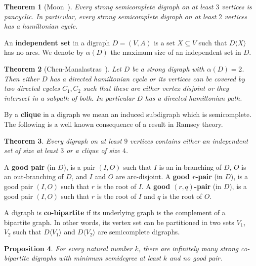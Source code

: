 \documentclass{article}
\newtheorem{theorem}{Theorem}
\newtheorem{proposition}[theorem]{Proposition}
\theoremstyle{definition}
\newcommand{\AY}[1]{{#1}}
\newcommand{\induce}[2]{#1\langle #2 \rangle}
\newcommand{\2}{\vspace{0.2cm}}
\begin{document}
\begin{theorem}[Moon~\cite{moonCMB9}]
\label{thm:pancyclic}
Every strong semicomplete digraph \AY{on at least $3$ vertices} is pancyclic. 
In particular, every strong semicomplete digraph \AY{on at least $2$ vertices} has a hamiltonian cycle.
\end{theorem}

An {\bf independent set} in a digraph $D=(V,A)$ is a set $X\subseteq
V$ such that $\induce{D}{X}$ has no arcs. We denote by $\alpha{}(D)$
the maximum size of an independent set in $D$.

\begin{theorem}[Chen-Manalastras~\cite{chenDM44}]
\label{thm:CMthm}
Let $D$ be a strong digraph with $\alpha{}(D)=2$. Then either $D$ has
a directed hamiltonian cycle or its vertices can be covered by two
directed cycles $C_1,C_2$ such that these are either vertex disjoint
or they intersect in a subpath of both. In particular $D$ has a
directed hamiltonian path.
\end{theorem}


By a {\bf clique} in a digraph we mean an induced subdigraph which is
semicomplete. The following is a well known consequence of a result in
Ramsey theory.

\begin{theorem}\label{thm:Ramsey}
Every digraph on at least $9$ vertices contains either an independent
set of size at least $3$ or a clique of size $4$.
\end{theorem}



A {\bf good pair} (in $D$), is a pair $(I,O)$ such that $I$ is an
in-branching of $D$, $O$ is an out-branching of $D$, and $I$ and $O$
are arc-disjoint.  A {\bf good $r$-pair} (in $D$), is a good pair
$(I,O)$ such that $r$ is the root of $I$.  A {\bf good $(r,q)$-pair}
(in $D$), is a good pair $(I,O)$ such that $r$ is the root of $I$ and
$q$ is the root of $O$.


A digraph is {\bf co-bipartite} if its underlying graph is the
complement of a bipartite graph. In other words, its vertex set can be
partitioned in two sets $V_1$, $V_2$ such that $D\langle V_1\rangle$
and $D\langle V_2\rangle$ are semicomplete digraphs.

\begin{proposition}
  \label{prop:strongnotenough}
  For every natural number $k$, there are infinitely many strong
  co-bipartite digraphs with minimum semidegree at least $k$ and no
  good pair.
\end{proposition}
\end{document}
